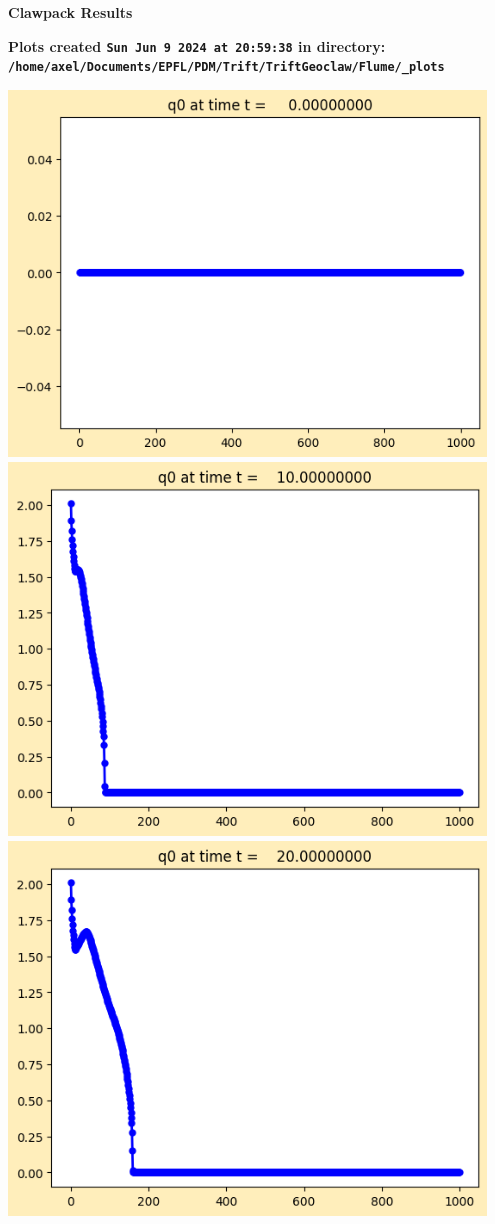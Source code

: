 \documentclass[11pt]{article}
\begin{document}
        \begin{center}{\Large\bf Clawpack Results}\vskip 5pt
        
        \bf Plots created {\tt Sun Jun  9 2024 at 20:59:38} in directory: \vskip 5pt
        \verb+/home/axel/Documents/EPFL/PDM/Trift/TriftGeoclaw/Flume/_plots+
        \end{center}
        \vskip 5pt
        \includegraphics[width=0.95\textwidth]{frame0000fig1.png}
\vskip 10pt 
\includegraphics[width=0.95\textwidth]{frame0001fig1.png}
\vskip 10pt 
\includegraphics[width=0.95\textwidth]{frame0002fig1.png}
\end{document}
